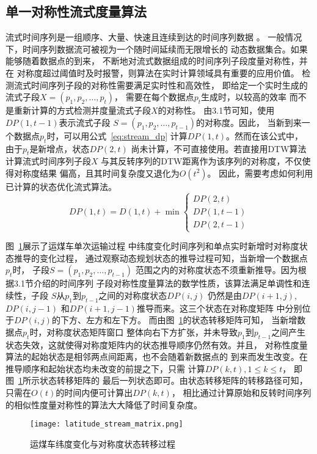 \subsection{单一对称性流式度量算法}
流式时间序列是一组顺序、大量、快速且连续到达的时间序列数据
\cite{DBLP:conf/apweb/KangWWDW18}。
一般情况下，时间序列数据流可被视为一个随时间延续而无限增长的
动态数据集合。如果能够随着数据点的到来，
不断地对流式数据组成的时间序列子段度量对称性，并在
对称度超过阈值时及时报警，则算法在实时计算领域具有重要的应用价值。
检测流式时间序列子段的对称性需要满足实时性和高效性，
即给定一个实时生成的流式子段$X=(p_1,p_2,\dots,p_t)$，
需要在每个数据点$p_t$生成时，以较高的效率
而不是重新计算的方式检测并度量流式子段$X$的对称性。
由3.1节可知，使用$DP\left(1,t-1\right)$表示流式子段
$S=(p_1,p_2,\dots,p_{t-1} )$的对称度。因此，
当新到来一个数据点$p_{t}$时，可以用公式~\ref{eq:stream_dp}
计算$DP\left(1,t\right)$。然而在该公式中，
由于$p_{t}$是新增点，状态$DP\left(2,t\right)$
尚未计算，不可直接使用。若直接用DTW算法计算流式时间序列子段$X$
与其反转序列的DTW距离作为该序列的对称度，不仅使得对称度结果
偏高，且其时间复杂度又退化为$O\left(t^2\right)$。
因此，需要考虑如何利用已计算的状态优化流式算法。
\begin{equation}
  DP(1, t)=D(1, t)+\min \left\{\begin{array}{c}
    D P(2, t) \\
    D P(1, t-1) \\
    D P(2, t-1)
    \end{array}\right.
  \label{eq:stream_dp}
\end{equation}

图~\ref{fig:latitude_stream_matrix}展示了运煤车单次运输过程
中纬度变化时间序列和单点实时新增时对称度状态推导的变化过程，
通过观察动态规划状态的推导过程可知，当新增一个数据点$p_t$时，
子段$S=\left(p_{1},p_{2},\dots,p_{t-1} \right)$
范围之内的对称度状态不须重新推导。因为根据3.1节介绍的时间序列
子段对称性度量算法的数学性质，该算法满足单调性和连续性，子段
$S$从$p_{1}$到$p_{t-1}$之间的对称度状态$DP\left(i,j\right)$
仍然是由$DP\left(i+1,j\right)$,$DP\left(i,j-1\right)$
和$DP\left(i+1,j-1\right)$推导而来。这三个状态在对称度矩阵
中分别位于$DP\left(i,j\right)$的下方、左方和左下方。
而由图~\ref{fig:latitude_stream_matrix}的状态转移矩阵可知，
当新增数据点$p_t$时，对称度状态矩阵窗口
整体向右下方扩张，并未导致$p_{1}$到$p_{t-1}$之间产生
状态失效，这就使得对称度矩阵内的状态推导顺序仍然有效。并且，
对称性度量算法的起始状态是相邻两点间距离，也不会随着新数据点的
到来而发生改变。在推导顺序和起始状态均未改变的前提之下，只需
计算$DP\left(k,t\right),1\leq k \leq t$，
即图~\ref{fig:latitude_stream_matrix}所示状态转移矩阵的
最后一列状态即可。由状态转移矩阵的转移路径可知，
只需在$O\left(t\right)$的时间内便可计算出$DP\left(k,t\right)$，
相比通过计算原始和反转时间序列的相似性度量对称性的算法大大降低了时间复杂度。
\begin{figure}
  \centering
  \texttt{[image: latitude\_stream\_matrix.png]}
  \caption{运煤车纬度变化与对称度状态转移过程}
  \label{fig:latitude_stream_matrix}
\end{figure}

